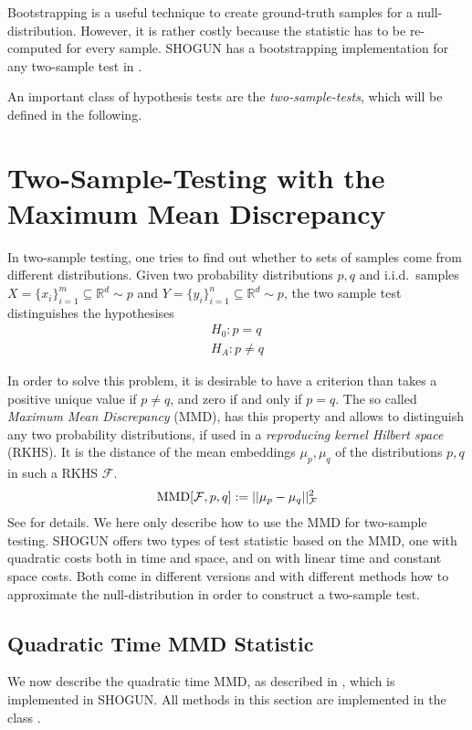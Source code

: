 Bootstrapping is a useful technique to create ground-truth samples for a null-distribution. However, it is rather costly because the statistic has to be re-computed for every sample. SHOGUN has a bootstrapping implementation for any two-sample test in .


An important class of hypothesis tests are the \emph{two-sample-tests}, which will be defined in the following.

\section{Two-Sample-Testing with the Maximum Mean Discrepancy}
\label{sec:mmd_into}
In two-sample testing, one tries to find out whether to sets of samples come from different distributions. Given two probability distributions $p,q$ and i.i.d.\ samples $X=\{x_i\}_{i=1}^m\subseteq \mathbb{R}^d\sim p$ and $Y=\{y_i\}_{i=1}^n\subseteq \mathbb{R}^d\sim p$, the two sample test distinguishes the hypothesises
\begin{align*}
H_0: p=q\\
H_A: p\neq q
\end{align*}

In order to solve this problem, it is desirable to have a criterion than takes a positive unique value if $p\neq q$, and zero if and only if $p=q$. The so called \emph{Maximum Mean Discrepancy} (MMD), has this property and allows to distinguish any two probability distributions, if used in a \emph{reproducing kernel Hilbert space} (RKHS). It is the distance of the mean embeddings $\mu_p, \mu_q$ of the distributions $p,q$ in such a RKHS $\mathcal{F}$.
\begin{align}
\label{eqn:mmd_population}
\operatorname{MMD}[\mathcal{F},p,q]:=||\mu_p-\mu_q||_\mathcal{F}^2
\end{align}
See \citep[Section 2]{Gretton2012} for details. We here only describe how to use the MMD for two-sample testing. SHOGUN offers two types of test statistic based on the MMD, one with quadratic costs both in time and space, and on with linear time and constant space costs. Both come in different versions and with different methods how to approximate the null-distribution in order to construct a two-sample test.

\subsection{Quadratic Time MMD Statistic}
\label{sec:mmd_quadratic}
We now describe the quadratic time MMD, as described in \citep[Lemma 6]{Gretton2012}, which is implemented in SHOGUN. All methods in this section are implemented in the class .

